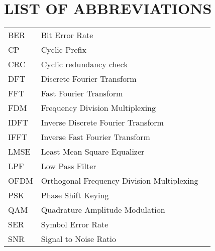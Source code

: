 \section*{LIST OF ABBREVIATIONS}
 {}

\begin{tabularx}{0.9\textwidth}{ L{0.4} L{1.3} L{1.3} }
    BER     & Bit Error Rate \\ %
    CP      & Cyclic Prefix \\
    CRC     & Cyclic redundancy check \\
    DFT     & Discrete Fourier Transform \\
    FFT     & Fast Fourier Transform \\
    FDM     & Frequency Division Multiplexing \\
    IDFT    & Inverse Discrete Fourier Transform \\
    IFFT    & Inverse Fast Fourier Transform \\
    LMSE    & Least Mean Square Equalizer \\ %
    LPF     & Low Pass Filter \\
    OFDM    & Orthogonal Frequency Division Multiplexing \\ %
    PSK     & Phase Shift Keying \\ %
    QAM     & Quadrature Amplitude Modulation \\ %
    SER     & Symbol Error Rate \\ %
    SNR     & Signal to Noise Ratio \\ %
\end{tabularx}

\newpage